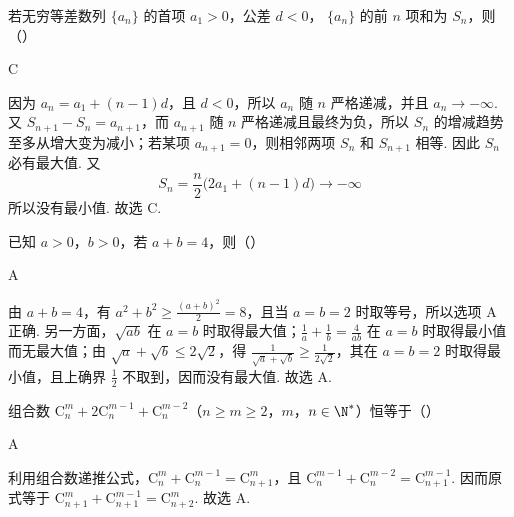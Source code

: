 \begin{problem}
若无穷等差数列 \( \{a_{n}\} \) 的首项 \( a_{1} > 0 \)，公差 \( d < 0 \)， \( \{a_{n}\} \) 的前 \( n \) 项和为 \( S_{n} \)，则（\quad）


\begin{answer}
C
\end{answer}

\begin{solution}
因为 \(a_n=a_1+(n-1)d\)，且 \(d<0\)，所以 \(a_n\) 随 \(n\) 严格递减，并且 \(a_n\to-\infty\). 又 \(S_{n+1}-S_n=a_{n+1}\)，而 \(a_{n+1}\) 随 \(n\) 严格递减且最终为负，所以 \(S_n\) 的增减趋势至多从增大变为减小；若某项 \(a_{n+1}=0\)，则相邻两项 \(S_n\) 和 \(S_{n+1}\) 相等. 因此 \(S_n\) 必有最大值. 又
\[
S_n=\frac{n}{2}\bigl(2a_1+(n-1)d\bigr)\to-\infty
\]
所以没有最小值. 故选 C.
\end{solution}
\end{problem}

\begin{problem}
已知 \(a > 0\)，\(b > 0\)，若 \(a + b = 4\)，则（\quad）


\begin{answer}
A
\end{answer}

\begin{solution}
由 \(a+b=4\)，有 \(a^2+b^2\geq\frac{(a+b)^2}{2}=8\)，且当 \(a=b=2\) 时取等号，所以选项 A 正确. 另一方面，\(\sqrt{ab}\) 在 \(a=b\) 时取得最大值；\(\frac1a+\frac1b=\frac4{ab}\) 在 \(a=b\) 时取得最小值而无最大值；由 \(\sqrt a+\sqrt b\leq2\sqrt2\)，得 \(\frac{1}{\sqrt a+\sqrt b}\geq\frac{1}{2\sqrt2}\)，其在 \(a=b=2\) 时取得最小值，且上确界 \(\frac12\) 不取到，因而没有最大值. 故选 A.
\end{solution}
\end{problem}

\begin{problem}
组合数 \( \mathrm C_n^m + 2\mathrm C_n^{m-1} + \mathrm C_n^{m-2} \)（\(n \geq m \geq 2\)，\(m\)，\(n \in \N^{*}\)）恒等于（\quad）


\begin{answer}
A
\end{answer}

\begin{solution}
利用组合数递推公式，\(\mathrm C_n^m+\mathrm C_n^{m-1}=\mathrm C_{n+1}^m\)，且 \(\mathrm C_n^{m-1}+\mathrm C_n^{m-2}=\mathrm C_{n+1}^{m-1}\). 因而原式等于 \(\mathrm C_{n+1}^m+\mathrm C_{n+1}^{m-1}=\mathrm C_{n+2}^m\). 故选 A.
\end{solution}
\end{problem}

